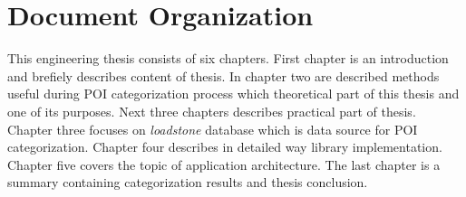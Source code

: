 \section{Document Organization}
This engineering thesis consists of six chapters. First chapter is an introduction and brefiely describes content of thesis. In chapter two are described methods useful during POI categorization process which theoretical part of this thesis and one of its purposes. Next three chapters describes practical part of thesis. Chapter three focuses on \textit{loadstone} database which is data source for POI categorization. Chapter four describes in detailed way library implementation. Chapter five covers the topic of application architecture. The last chapter is a summary containing categorization results and thesis conclusion.
